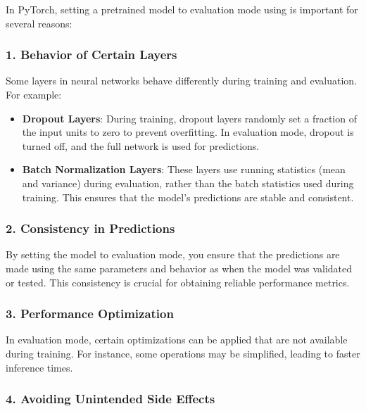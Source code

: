 \begin{botresponse}

In PyTorch, setting a pretrained model to evaluation mode using  is important for several reasons:

\subsubsection{1. \textbf{Behavior of Certain Layers}}

Some layers in neural networks behave differently during training and evaluation. For example:

\begin{itemize}
\item \textbf{Dropout Layers}: During training, dropout layers randomly set a fraction of the input units to zero to prevent overfitting. In evaluation mode, dropout is turned off, and the full network is used for predictions.
\item \textbf{Batch Normalization Layers}: These layers use running statistics (mean and variance) during evaluation, rather than the batch statistics used during training. This ensures that the model's predictions are stable and consistent.
\end{itemize}

\subsubsection{2. \textbf{Consistency in Predictions}}

By setting the model to evaluation mode, you ensure that the predictions are made using the same parameters and behavior as when the model was validated or tested. This consistency is crucial for obtaining reliable performance metrics.

\subsubsection{3. \textbf{Performance Optimization}}

In evaluation mode, certain optimizations can be applied that are not available during training. For instance, some operations may be simplified, leading to faster inference times.

\subsubsection{4. \textbf{Avoiding Unintended Side Effects}}


\end{botresponse}
